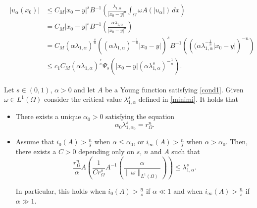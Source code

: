 \documentclass[10pt,a4paper]{amsart}
\begin{document}
\begin{align}\label{desig0}
\begin{split}
|u_\alpha(x_0)|&\leq C_M |x_0-y|^s B^{-1}\left(  \frac{\lambda_{1,\alpha} }{|x_0-y|^n}  \int_\Omega \omega A(|u_\alpha|)\,dx\right)\\
&= C_M |x_0-y|^s B^{-1}\left(   \frac{ \alpha \lambda_{1,\alpha}}{|x_0-y|^n}\right)\\
&=
C_M (\alpha\lambda_{1,\alpha})^\frac{s}{n} \left((\alpha \lambda_{1,\alpha})^{-\frac{1}{n}} |x_0-y| \right)^s B^{-1}\left(  \left( (\alpha \lambda_{1,\alpha}^{-\frac1n} |x_0-y| \right)^{-n} \right)\\
&\leq  
c_1  C_M \left(\alpha \lambda_{1,\alpha}  \right)^{\frac{s}{n}}\Psi_s \left( |x_0-y| \left( \alpha \lambda_{1,\alpha}^s   \right)^{-\frac{1}{n}}\right).
\end{split}
\end{align}

\begin{thm}  \label{teo2}
Let $s\in (0,1)$, $\alpha>0$ and let $A$ be a Young function satisfying \eqref{cond1}. Given $\omega \in L^1(\Omega)$ consider the critical value $\lambda_{1,\alpha}^s$  defined in \eqref{minimi}. It holds that
\begin{itemize}
\item[i)] There exists a unique $\alpha_0>0$ satisfying the equation
$$
\alpha_0 \lambda_{1,\alpha_0}^s = r_\Omega^n.
$$

\item[ii)] 
Assume that $i_0(A)>\frac{n}{s}$ when $\alpha\leq \alpha_0$, or $i_\infty(A) >\frac{n}{s}$ when $\alpha> \alpha_0$.  Then, there exists a  $C>0$ depending only on  $s$, $n$ and $A$ such that
\begin{equation} \label{ineq.2}
\frac{r_\Omega^n}{\alpha} A\left( \frac{1}{C r_\Omega ^s}A^{-1}\left( \frac{\alpha}{ \|\omega\|_{L^1(\Omega)}} \right) \right)
\leq 
    \lambda_{1,\alpha}^s.
\end{equation}


\noindent In particular, this holds when $i_0(A)>\frac{n}{s}$ if $\alpha\ll1$ and when $i_\infty(A) >\frac{n}{s}$ if $\alpha\gg1$.
\end{itemize}
\end{thm}
\end{document}
